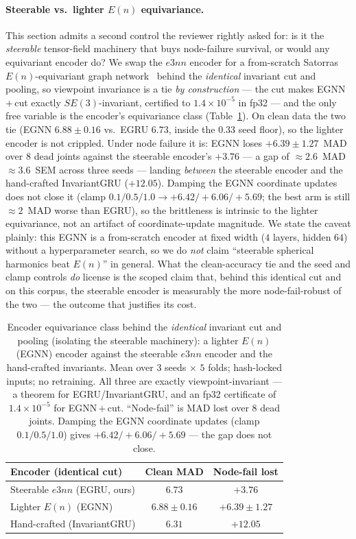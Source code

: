 \paragraph{Steerable vs.\ lighter $E(n)$ equivariance.} This section admits a second control the
reviewer rightly asked for: is it the \emph{steerable} tensor-field machinery that buys node-failure
survival, or would any equivariant encoder do? We swap the $e3nn$ encoder for a from-scratch Satorras
$E(n)$-equivariant graph network~\cite{satorras2021egnn} behind the \emph{identical} invariant cut and
pooling, so viewpoint invariance is a tie \emph{by construction} --- the cut makes EGNN\,$+$\,cut
exactly $SE(3)$-invariant, certified to $1.4\times10^{-5}$ in fp32 --- and the only free variable is
the encoder's equivariance class (Table~\ref{tab:egnn}). On clean data the two tie (EGNN $6.88\pm0.16$
vs.\ EGRU $6.73$, inside the $0.33$ seed floor), so the lighter encoder is not crippled. Under node
failure it is: EGNN loses $+6.39\pm1.27$~MAD over $8$ dead joints against the steerable encoder's
$+3.76$ --- a gap of $\approx\!2.6$~MAD $\approx\!3.6$~SEM across three seeds --- landing \emph{between}
the steerable encoder and the hand-crafted InvariantGRU ($+12.05$). Damping the EGNN coordinate updates
does not close it (clamp $0.1/0.5/1.0 \to +6.42/+6.06/+5.69$; the best arm is still $\approx\!2$~MAD
worse than EGRU), so the brittleness is intrinsic to the lighter equivariance, not an artifact of
coordinate-update magnitude. We state the caveat plainly: this EGNN is a from-scratch encoder at fixed
width ($4$ layers, hidden $64$) without a hyperparameter search, so we do \emph{not} claim ``steerable
spherical harmonics beat $E(n)$'' in general. What the clean-accuracy tie and the seed and clamp
controls \emph{do} license is the scoped claim that, behind this identical cut and on this corpus, the
steerable encoder is measurably the more node-fail-robust of the two --- the outcome that justifies its
cost.

\begin{table}[!t]
\centering
\caption{Encoder equivariance class behind the \emph{identical} invariant cut and pooling (isolating
the steerable machinery): a lighter $E(n)$ (EGNN) encoder against the steerable $e3nn$ encoder and the
hand-crafted invariants. Mean over $3$ seeds $\times$ $5$ folds; hash-locked inputs; no retraining. All
three are exactly viewpoint-invariant --- a theorem for EGRU/InvariantGRU, and an fp32 certificate of
$1.4\times10^{-5}$ for EGNN\,$+$\,cut. ``Node-fail'' is MAD lost over $8$ dead joints. Damping the EGNN
coordinate updates (clamp $0.1/0.5/1.0$) gives $+6.42/+6.06/+5.69$ --- the gap does not close.}
\label{tab:egnn}
\small
\begin{tabular}{lcc}
\toprule
Encoder (identical cut) & Clean MAD & Node-fail lost \\
\midrule
Steerable $e3nn$ (EGRU, ours) & $6.73$          & $\mathbf{+3.76}$ \\
Lighter $E(n)$ (EGNN)         & $6.88 \pm 0.16$ & $+6.39 \pm 1.27$ \\
Hand-crafted (InvariantGRU)   & $6.31$          & $+12.05$ \\
\bottomrule
\end{tabular}
\end{table}

